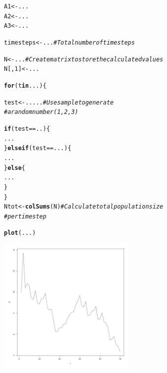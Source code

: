 \documentclass{article}\usepackage[]{graphicx}\usepackage[]{color}
\makeatletter
\newcommand{\hlnum}[1]{\textcolor[rgb]{0.686,0.059,0.569}{#1}}%
\newcommand{\hlcom}[1]{\textcolor[rgb]{0.678,0.584,0.686}{\textit{#1}}}%
\newcommand{\hlopt}[1]{\textcolor[rgb]{0,0,0}{#1}}%
\newcommand{\hlstd}[1]{\textcolor[rgb]{0.345,0.345,0.345}{#1}}%
\newcommand{\hlkwa}[1]{\textcolor[rgb]{0.161,0.373,0.58}{\textbf{#1}}}%
\newcommand{\hlkwb}[1]{\textcolor[rgb]{0.69,0.353,0.396}{#1}}%
\newcommand{\hlkwd}[1]{\textcolor[rgb]{0.737,0.353,0.396}{\textbf{#1}}}%
\newenvironment{kframe}{%
 \def\at@end@of@kframe{}%
 \ifinner\ifhmode%
  \def\at@end@of@kframe{\end{minipage}}%
  \begin{minipage}{\columnwidth}%
 \fi\fi%
 \def\FrameCommand##1{\hskip\@totalleftmargin \hskip-\fboxsep
 \colorbox{shadecolor}{##1}\hskip-\fboxsep
     \hskip-\linewidth \hskip-\@totalleftmargin \hskip\columnwidth}%
 \MakeFramed {\advance\hsize-\width
   \@totalleftmargin\z@ \linewidth\hsize
   \@setminipage}}%
 {\par\unskip\endMakeFramed%
 \at@end@of@kframe}
\newenvironment{knitrout}{}{} %
\makeatother
\begin{document}
\begin{knitrout}
\color{fgcolor}\begin{kframe}
\begin{alltt}
\hlstd{A1}\hlkwb{<-}\hlstd{...}
\hlstd{A2}\hlkwb{<-}\hlstd{...}
\hlstd{A3}\hlkwb{<-}\hlstd{...}

\hlstd{timesteps}\hlkwb{<-}\hlstd{...} \hlcom{# Total number of timesteps}

\hlstd{N}\hlkwb{<-}\hlstd{...} \hlcom{# Create matrix to store the calculated values}
\hlstd{N[,}\hlnum{1}\hlstd{]}\hlkwb{<-}\hlstd{...}

\hlkwa{for}\hlstd{(t} \hlkwa{in} \hlstd{...)\{}

  \hlstd{test}\hlkwb{<-}\hlstd{.....} \hlcom{# Use sample to generate }
              \hlcom{# a random number (1,2,3)}

  \hlkwa{if}\hlstd{(test}\hlopt{==}\hlstd{..)\{}
    \hlstd{...}
  \hlstd{\}}\hlkwa{else if}\hlstd{(test}\hlopt{==}\hlstd{...)\{}
    \hlstd{...}
  \hlstd{\}}\hlkwa{else}\hlstd{\{}
    \hlstd{...}
  \hlstd{\}}
\hlstd{\}}
\hlstd{Ntot}\hlkwb{<-}\hlkwd{colSums}\hlstd{(N)}  \hlcom{# Calculate total population size}
                  \hlcom{# per timestep}

\hlkwd{plot}\hlstd{(...)}
\end{alltt}
\end{kframe}
\end{knitrout}

\begin{knitrout}
\color{fgcolor}

{\centering \includegraphics[width=0.5\textwidth]{figure/sim_one-1} 

}



\end{knitrout}
\end{document}

